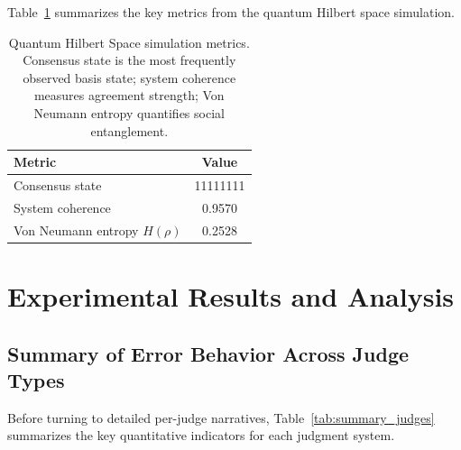 \documentclass[12pt,a4paper]{article}
\theoremstyle{definition}
\theoremstyle{remark}
\begin{document}
Table~\ref{tab:quantum_hilbert_stats} summarizes the key metrics from the quantum Hilbert space simulation.

\begin{table}[htbp]
\centering
\caption{Quantum Hilbert Space simulation metrics. Consensus state is the most frequently observed basis state; system coherence measures agreement strength; Von Neumann entropy quantifies social entanglement.}
\label{tab:quantum_hilbert_stats}
\begin{tabular}{lc}
\toprule
\textbf{Metric} & \textbf{Value} \\
\midrule
Consensus state & 11111111 \\
System coherence & 0.9570 \\
Von Neumann entropy $H(\rho)$ & 0.2528 \\
\bottomrule
\end{tabular}
\end{table}

\section{Experimental Results and Analysis}
\label{sec:results}

\subsection{Summary of Error Behavior Across Judge Types}

Before turning to detailed per-judge narratives, Table~\ref{tab:summary_judges}
summarizes the key quantitative indicators for each judgment system.
\end{document}
